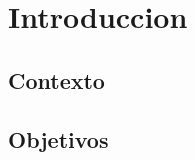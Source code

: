 \chapter{Introduccion}
\label{ch:introduccion}

\section{Contexto}
\lipsum[1-3]  %

\section{Objetivos}
\lipsum[4-6]  %